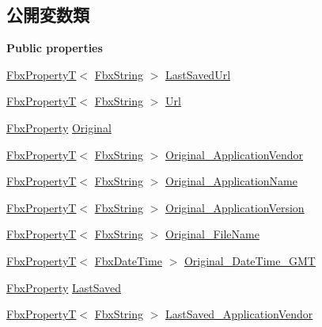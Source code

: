 \subsection*{公開変数類}
\begin{Indent}\textbf{ Public properties}\par
\begin{DoxyCompactItemize}
\item 
\hyperlink{class_fbx_property_t}{Fbx\+PropertyT}$<$ \hyperlink{class_fbx_string}{Fbx\+String} $>$ \hyperlink{class_fbx_document_info_a8a4eb2393037c8989307f780cab77ca1}{Last\+Saved\+Url}
\item 
\hyperlink{class_fbx_property_t}{Fbx\+PropertyT}$<$ \hyperlink{class_fbx_string}{Fbx\+String} $>$ \hyperlink{class_fbx_document_info_a074e6706550f89bcef9152030a522f11}{Url}
\item 
\hyperlink{class_fbx_property}{Fbx\+Property} \hyperlink{class_fbx_document_info_acb08111b968a17d25bdb2e01391500b8}{Original}
\item 
\hyperlink{class_fbx_property_t}{Fbx\+PropertyT}$<$ \hyperlink{class_fbx_string}{Fbx\+String} $>$ \hyperlink{class_fbx_document_info_afe6f02a61f882355521e6f1e45de0a9e}{Original\+\_\+\+Application\+Vendor}
\item 
\hyperlink{class_fbx_property_t}{Fbx\+PropertyT}$<$ \hyperlink{class_fbx_string}{Fbx\+String} $>$ \hyperlink{class_fbx_document_info_abcddf84735f7ceac288ed1990c837f25}{Original\+\_\+\+Application\+Name}
\item 
\hyperlink{class_fbx_property_t}{Fbx\+PropertyT}$<$ \hyperlink{class_fbx_string}{Fbx\+String} $>$ \hyperlink{class_fbx_document_info_ab995992091af994047deccc609f1bcfd}{Original\+\_\+\+Application\+Version}
\item 
\hyperlink{class_fbx_property_t}{Fbx\+PropertyT}$<$ \hyperlink{class_fbx_string}{Fbx\+String} $>$ \hyperlink{class_fbx_document_info_aa694d414acff41e98cd5f130c7091873}{Original\+\_\+\+File\+Name}
\item 
\hyperlink{class_fbx_property_t}{Fbx\+PropertyT}$<$ \hyperlink{class_fbx_date_time}{Fbx\+Date\+Time} $>$ \hyperlink{class_fbx_document_info_adbfedbef249bc1ef77e06ad01e5067c6}{Original\+\_\+\+Date\+Time\+\_\+\+G\+MT}
\item 
\hyperlink{class_fbx_property}{Fbx\+Property} \hyperlink{class_fbx_document_info_a1f7b1001a8791ee8fc9f9655c543c84e}{Last\+Saved}
\item 
\hyperlink{class_fbx_property_t}{Fbx\+PropertyT}$<$ \hyperlink{class_fbx_string}{Fbx\+String} $>$ \hyperlink{class_fbx_document_info_a051cf70eb77b5b8278ebb9a88af20bef}{Last\+Saved\+\_\+\+Application\+Vendor}

\end{DoxyCompactItemize}
\end{Indent}
